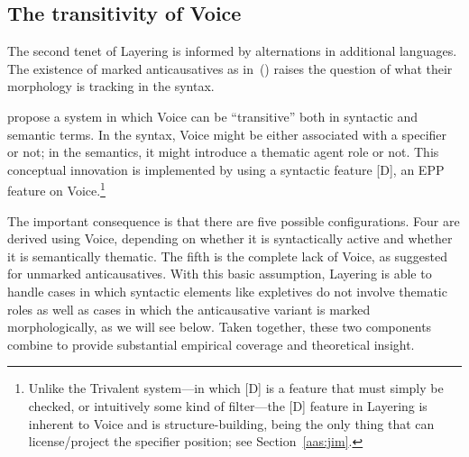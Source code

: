 \begin{exe}
\begin{xlist}
\begin{exe}
\begin{exe}
\begin{xlist}
	\subsection{The transitivity of Voice} \label{aas:layering:features}
The second tenet of Layering is informed by alternations in additional languages. The existence of marked anticausatives as in~(\nextx) raises the question of what their morphology is tracking in the syntax.
 \begin{exe}
	
 \z 

\cite{layering15} propose a system in which Voice can be ``transitive'' both in syntactic and semantic terms. In the syntax, Voice might be either associated with a specifier or not; in the semantics, it might introduce a thematic agent role or not. This conceptual innovation is implemented by using a syntactic feature [D], an EPP feature on Voice.\footnote{Unlike the Trivalent system---in which [D] is a feature that must simply be checked, or intuitively some kind of filter---the [D] feature in Layering is inherent to Voice and is structure-building, being the only thing that can license/project the specifier position; see Section~\ref{aas:jim}.}

The important consequence is that there are five possible configurations. Four are derived using Voice, depending on whether it is syntactically active and whether it is semantically thematic. The fifth is the complete lack of Voice, as suggested for unmarked anticausatives. With this basic assumption, Layering is able to handle cases in which syntactic elements like expletives do not involve thematic roles as well as cases in which the anticausative variant is marked morphologically, as we will see below. Taken together, these two components combine to provide substantial empirical coverage and theoretical insight.


\end{exe}
\end{xlist}
\end{exe}
\end{exe}
\end{xlist}
\end{exe}

